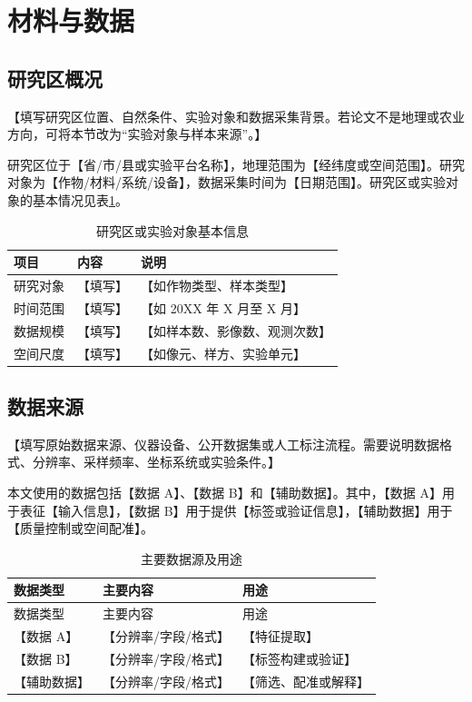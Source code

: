 \section{材料与数据}\label{ch:data}

\subsection{研究区概况}

【填写研究区位置、自然条件、实验对象和数据采集背景。若论文不是地理或农业方向，可将本节改为“实验对象与样本来源”。】

研究区位于【省/市/县或实验平台名称】，地理范围为【经纬度或空间范围】。研究对象为【作物/材料/系统/设备】，数据采集时间为【日期范围】。研究区或实验对象的基本情况见表\ref{tab:study-area}。

\begin{table}[ht]
  \centering
  \caption{研究区或实验对象基本信息}
  \label{tab:study-area}
  \begin{tabular}{lll}
    \toprule
    项目 & 内容 & 说明 \\
    \midrule
    研究对象 & 【填写】 & 【如作物类型、样本类型】 \\
    时间范围 & 【填写】 & 【如 20XX 年 X 月至 X 月】 \\
    数据规模 & 【填写】 & 【如样本数、影像数、观测次数】 \\
    空间尺度 & 【填写】 & 【如像元、样方、实验单元】 \\
    \bottomrule
  \end{tabular}
\end{table}

\subsection{数据来源}

【填写原始数据来源、仪器设备、公开数据集或人工标注流程。需要说明数据格式、分辨率、采样频率、坐标系统或实验条件。】

本文使用的数据包括【数据 A】、【数据 B】和【辅助数据】。其中，【数据 A】用于表征【输入信息】，【数据 B】用于提供【标签或验证信息】，【辅助数据】用于【质量控制或空间配准】。

\begin{longtable}{lll}
\caption{主要数据源及用途}\label{tab:data-source}\\
\toprule
数据类型 & 主要内容 & 用途 \\
\midrule
\endfirsthead
\toprule
数据类型 & 主要内容 & 用途 \\
\midrule
\endhead
\bottomrule
\endfoot
【数据 A】 & 【分辨率/字段/格式】 & 【特征提取】 \\
【数据 B】 & 【分辨率/字段/格式】 & 【标签构建或验证】 \\
【辅助数据】 & 【分辨率/字段/格式】 & 【筛选、配准或解释】 \\
\end{longtable}

